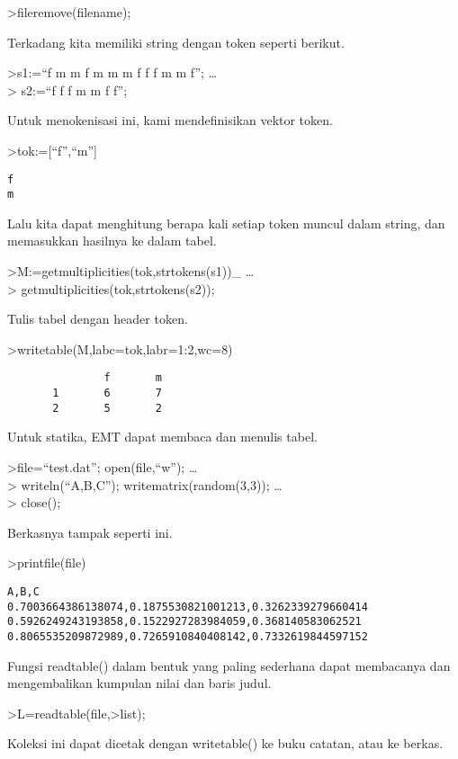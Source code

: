 \documentclass[
]{book}
\begin{document}
\textgreater fileremove(filename);

Terkadang kita memiliki string dengan token seperti berikut.

\textgreater s1:=``f m m f m m m f f f m m f''; \ldots{}\\
\textgreater{} s2:=``f f f m m f f'';

Untuk menokenisasi ini, kami mendefinisikan vektor token.

\textgreater tok:={[}``f'',``m''{]}

\begin{verbatim}
f
m
\end{verbatim}

Lalu kita dapat menghitung berapa kali setiap token muncul dalam string, dan memasukkan hasilnya ke dalam tabel.

\textgreater M:=getmultiplicities(tok,strtokens(s1))\_ \ldots{}\\
\textgreater{} getmultiplicities(tok,strtokens(s2));

Tulis tabel dengan header token.

\textgreater writetable(M,labc=tok,labr=1:2,wc=8)

\begin{verbatim}
               f       m
       1       6       7
       2       5       2
\end{verbatim}

Untuk statika, EMT dapat membaca dan menulis tabel.

\textgreater file=``test.dat''; open(file,``w''); \ldots{}\\
\textgreater{} writeln(``A,B,C''); writematrix(random(3,3)); \ldots{}\\
\textgreater{} close();

Berkasnya tampak seperti ini.

\textgreater printfile(file)

\begin{verbatim}
A,B,C
0.7003664386138074,0.1875530821001213,0.3262339279660414
0.5926249243193858,0.1522927283984059,0.368140583062521
0.8065535209872989,0.7265910840408142,0.7332619844597152
\end{verbatim}

Fungsi readtable() dalam bentuk yang paling sederhana dapat membacanya dan mengembalikan kumpulan nilai dan baris judul.

\textgreater L=readtable(file,\textgreater list);

Koleksi ini dapat dicetak dengan writetable() ke buku catatan, atau ke berkas.
\end{document}
